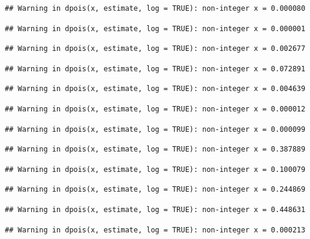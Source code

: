 \documentclass[]{article}
\begin{document}
\begin{verbatim}
## Warning in dpois(x, estimate, log = TRUE): non-integer x = 0.000080
\end{verbatim}

\begin{verbatim}
## Warning in dpois(x, estimate, log = TRUE): non-integer x = 0.000001
\end{verbatim}

\begin{verbatim}
## Warning in dpois(x, estimate, log = TRUE): non-integer x = 0.002677
\end{verbatim}

\begin{verbatim}
## Warning in dpois(x, estimate, log = TRUE): non-integer x = 0.072891
\end{verbatim}

\begin{verbatim}
## Warning in dpois(x, estimate, log = TRUE): non-integer x = 0.004639
\end{verbatim}

\begin{verbatim}
## Warning in dpois(x, estimate, log = TRUE): non-integer x = 0.000012
\end{verbatim}

\begin{verbatim}
## Warning in dpois(x, estimate, log = TRUE): non-integer x = 0.000099
\end{verbatim}

\begin{verbatim}
## Warning in dpois(x, estimate, log = TRUE): non-integer x = 0.387889
\end{verbatim}

\begin{verbatim}
## Warning in dpois(x, estimate, log = TRUE): non-integer x = 0.100079
\end{verbatim}

\begin{verbatim}
## Warning in dpois(x, estimate, log = TRUE): non-integer x = 0.244869
\end{verbatim}

\begin{verbatim}
## Warning in dpois(x, estimate, log = TRUE): non-integer x = 0.448631
\end{verbatim}

\begin{verbatim}
## Warning in dpois(x, estimate, log = TRUE): non-integer x = 0.000213
\end{verbatim}
\end{document}
